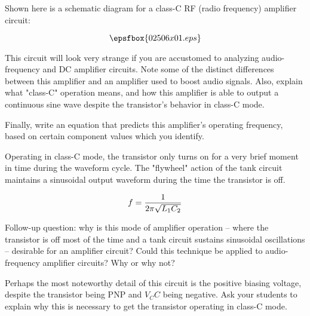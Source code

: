 

Shown here is a schematic diagram for a class-C RF (radio frequency) amplifier circuit:

$$\epsfbox{02506x01.eps}$$

This circuit will look very strange if you are accustomed to analyzing audio-frequency and DC amplifier circuits.  Note some of the distinct differences between this amplifier and an amplifier used to boost audio signals.  Also, explain what "class-C" operation means, and how this amplifier is able to output a continuous sine wave despite the transistor's behavior in class-C mode.

\vskip 10pt

Finally, write an equation that predicts this amplifier's operating frequency, based on certain component values which you identify.







Operating in class-C mode, the transistor only turns on for a very brief moment in time during the waveform cycle.  The "flywheel" action of the tank circuit maintains a sinusoidal output waveform during the time the transistor is off.

$$f = {1 \over {2 \pi \sqrt{L_1 C_2}}}$$

Follow-up question: why is this mode of amplifier operation -- where the transistor is off most of the time and a tank circuit sustains sinusoidal oscillations -- desirable for an amplifier circuit?  Could this technique be applied to audio-frequency amplifier circuits?  Why or why not?







Perhaps the most noteworthy detail of this circuit is the positive biasing voltage, despite the transistor being PNP and $V_CC$ being negative.  Ask your students to explain why this is necessary to get the transistor operating in class-C mode.




